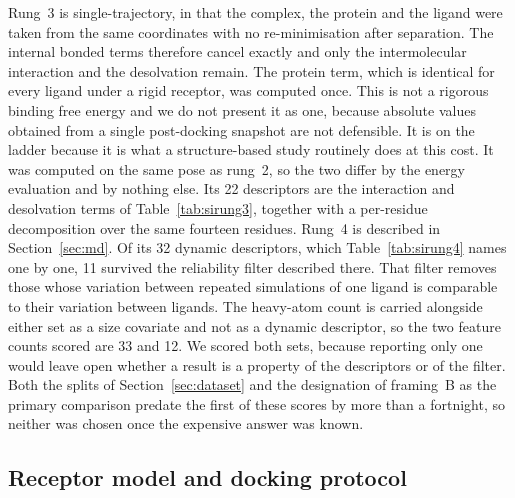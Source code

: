 Rung~3 is single-trajectory, in that the complex, the protein and the ligand were
taken from the same coordinates with no re-minimisation after separation. The internal bonded
terms therefore cancel exactly and only the intermolecular interaction and the
desolvation remain. The protein term, which is identical for every ligand under a rigid
receptor, was computed once. This is not a rigorous binding free energy and we do not
present it as one, because absolute values obtained from a single post-docking snapshot
are not defensible. It is on the ladder because it is what a structure-based study
routinely does at this cost. It was computed on the same pose as rung~2, so the two
differ by the energy evaluation and by nothing else. Its 22 descriptors are the
interaction and desolvation terms of Table~\ref{tab:sirung3}, together with a
per-residue decomposition over the same fourteen residues. Rung~4 is described in
Section~\ref{sec:md}. Of its 32 dynamic descriptors, which Table~\ref{tab:sirung4}
names one by one, 11 survived the reliability filter described there. That filter
removes those whose variation between repeated simulations of one ligand is comparable
to their variation between ligands. The heavy-atom count is carried alongside either
set as a size covariate and not as a dynamic descriptor, so the two feature counts
scored are 33 and 12. We scored both sets, because reporting only one would leave open
whether a result is a property of the descriptors or of the filter. Both the splits of
Section~\ref{sec:dataset} and the designation of framing~B as the primary comparison
predate the first of these scores by more than a fortnight, so neither was chosen once
the expensive answer was known.

\subsection{Receptor model and docking protocol}\label{sec:dock}

